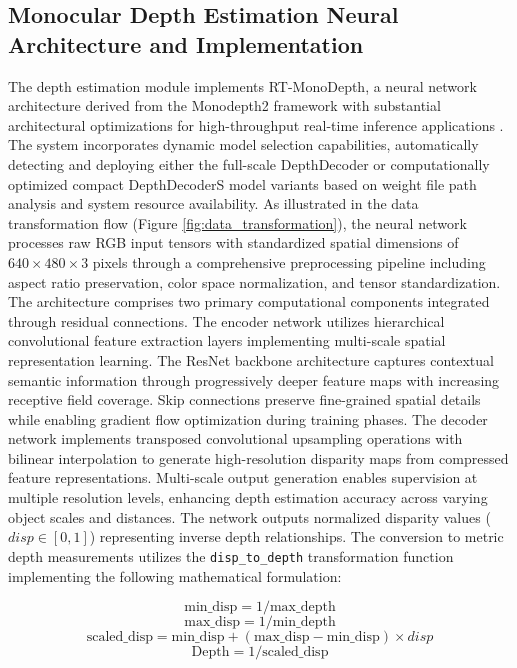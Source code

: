\documentclass{article}
\begin{document}
\subsection{Monocular Depth Estimation Neural Architecture and Implementation}
The depth estimation module implements RT-MonoDepth, a neural network architecture derived from the Monodepth2 framework with substantial architectural optimizations for high-throughput real-time inference applications \cite{feng2024}. The system incorporates dynamic model selection capabilities, automatically detecting and deploying either the full-scale DepthDecoder or computationally optimized compact DepthDecoderS model variants based on weight file path analysis and system resource availability. As illustrated in the data transformation flow (Figure \ref{fig:data_transformation}), the neural network processes raw RGB input tensors with standardized spatial dimensions of $640 \times 480 \times 3$ pixels through a comprehensive preprocessing pipeline including aspect ratio preservation, color space normalization, and tensor standardization. The architecture comprises two primary computational components integrated through residual connections. The encoder network utilizes hierarchical convolutional feature extraction layers implementing multi-scale spatial representation learning. The ResNet backbone architecture captures contextual semantic information through progressively deeper feature maps with increasing receptive field coverage. Skip connections preserve fine-grained spatial details while enabling gradient flow optimization during training phases. The decoder network implements transposed convolutional upsampling operations with bilinear interpolation to generate high-resolution disparity maps from compressed feature representations. Multi-scale output generation enables supervision at multiple resolution levels, enhancing depth estimation accuracy across varying object scales and distances. The network outputs normalized disparity values ($disp \in [0,1]$) representing inverse depth relationships. The conversion to metric depth measurements utilizes the \texttt{disp\_to\_depth} transformation function implementing the following mathematical formulation:

\begin{equation}
\text{min\_disp} = 1 / \text{max\_depth}
\end{equation}
\begin{equation}
\text{max\_disp} = 1 / \text{min\_depth}
\end{equation}
\begin{equation}
\text{scaled\_disp} = \text{min\_disp} + (\text{max\_disp} - \text{min\_disp}) \times disp
\end{equation}
\begin{equation}
\text{Depth} = 1 / \text{scaled\_disp}
\end{equation}
\end{document}
